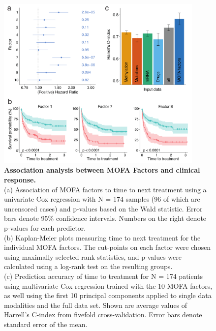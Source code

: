 
\begin{figure}[H]
	\centering 	
	\includegraphics[width=0.9\textwidth]{MOFA_CLL_Cox}
	\caption{
	\textbf{Association analysis between MOFA Factors and clinical response.}\\
	(a) Association of MOFA factors to time to next treatment using a univariate Cox regression with N = 174 samples (96 of which are uncensored cases) and p-values based on the Wald statistic. Error bars denote 95\% confidence intervals. Numbers on the right denote p-values for each predictor.\\
	(b) Kaplan-Meier plots measuring time to next treatment for the individual MOFA factors. The cut-points on each factor were chosen using maximally selected rank statistics, and p-values were calculated using a log-rank test on the resulting groups.\\
	(c) Prediction accuracy of time to treatment for N = 174 patients using multivariate Cox regression trained with the 10 MOFA factors, as well using the first 10 principal components applied to single data modalities and the full data set. Shown are average values of Harrell's C-index from fivefold cross-validation. Error bars denote standard error of the mean.
	}
	\label{fig:MOFA_CLL_Cox}
\end{figure}


